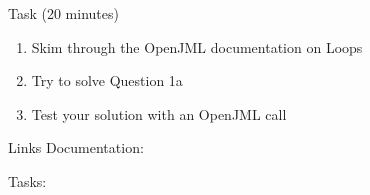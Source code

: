 \begin{frame}{\insertsubsection}
	
	\begin{fancycolumns}
		
		\begin{definition}{Task (20 minutes)}
			
			\begin{enumerate}
				\item Skim through the OpenJML documentation on Loops
				\item Try to solve Question 1a
				\item Test your solution with an OpenJML call
			\end{enumerate}
		\end{definition}
		
		\nextcolumn
		
		\begin{example}{Links}
			Documentation: 
			\begin{center}
				\centering{}
			\end{center}
			
			
			Tasks: 
			\begin{center}
				\centering{}
			\end{center}
		\end{example}
		
	\end{fancycolumns}
\end{frame}
